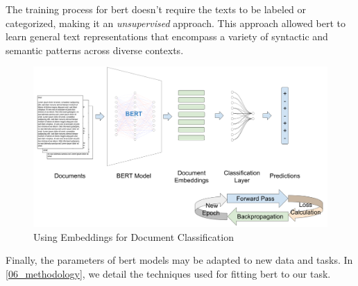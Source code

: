 \label{02_using_bert_for_text_classification}


The training process for \gls{bert} doesn't require the texts to be labeled or categorized, making it an \emph{unsupervised} approach. This approach allowed \gls{bert} to learn general text representations that encompass a variety of syntactic and semantic patterns across diverse contexts.



\begin{figure}
    \centering
    \includegraphics[width=\textwidth]{Figures/02/02_BERT_for_document_classification.png}
    \caption{Using \BERT{} Embeddings for Document Classification}
    \label{fig:02_bert_for_document_classification}
\end{figure}


Finally, the parameters of \gls{bert} models may be adapted to new data and tasks. In \headerName{} \ref{06_methodology}, we detail the techniques used for fitting \gls{bert} to our task.




